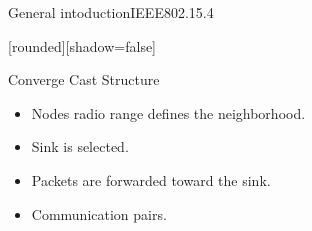 \begin{withoutheadline}

\begin{frame}{General intoduction}{IEEE802.15.4}

[rounded][shadow=false]


\begin{minipage}[t]{0.48\linewidth}

\begin{block}{Converge Cast Structure}
    \begin{itemize}
    \item Nodes radio range defines the neighborhood.
    \item<2-> \alert{Sink} is selected. 
    \item<3-> Packets are forwarded \alert{toward the sink}.
    \item<4-> Communication pairs.
    \end{itemize}
    \end{block}
\end{minipage}\hfill
\begin{minipage}[t]{0.48\linewidth}
\centering
 \begin{figure}[p]


\end{figure}
\end{minipage}
\end{frame}
\end{withoutheadline}
